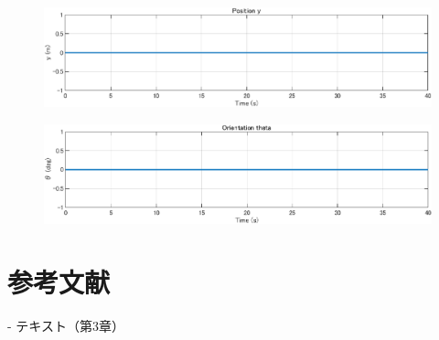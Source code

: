 \documentclass[10pt,a4paper,titlepage]{jreport} %
\begin{document}
\begin{figure}[H] %
  \centering
  \includegraphics[width=0.6\linewidth]{242C2016_NaoOkumura_3_2_c.eps} %
\end{figure}

\begin{figure}[H] %
  \centering
  \includegraphics[width=0.6\linewidth]{242C2016_NaoOkumura_3_2_d.eps} %
\end{figure}

\chapter{参考文献}

- テキスト（第3章）
\end{document}
